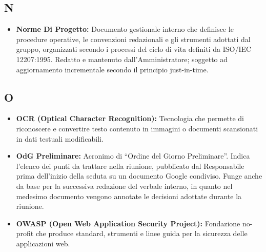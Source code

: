 {}
\subsection*{N}
\begin{itemize}[leftmargin=*]
    \item \textbf{Norme Di Progetto:} Documento gestionale interno che definisce
          le procedure operative, le convenzioni redazionali e gli strumenti adottati
          dal gruppo, organizzati secondo i processi del ciclo di vita definiti da
          ISO/IEC 12207:1995. Redatto e mantenuto dall'Amministratore; soggetto
          ad aggiornamento incrementale secondo il principio just-in-time.
\end{itemize}
 
{}
\subsection*{O}
\begin{itemize}[leftmargin=*]
    \item \textbf{OCR (Optical Character Recognition):} Tecnologia che permette di riconoscere e convertire testo contenuto in immagini o documenti scansionati in dati testuali modificabili.
    \item \textbf{OdG Preliminare:} Acronimo di ``Ordine del Giorno Preliminare''.
          Indica l'elenco dei punti da trattare nella riunione, pubblicato dal
          Responsabile prima dell'inizio della seduta su un documento Google
          condiviso. Funge anche da base per la successiva redazione del verbale
          interno, in quanto nel medesimo documento vengono annotate le decisioni
          adottate durante la riunione.
    \item \textbf{OWASP (Open Web Application Security Project):} Fondazione no-profit che produce standard, strumenti e linee guida per la sicurezza delle applicazioni web.
\end{itemize}
 
{}
